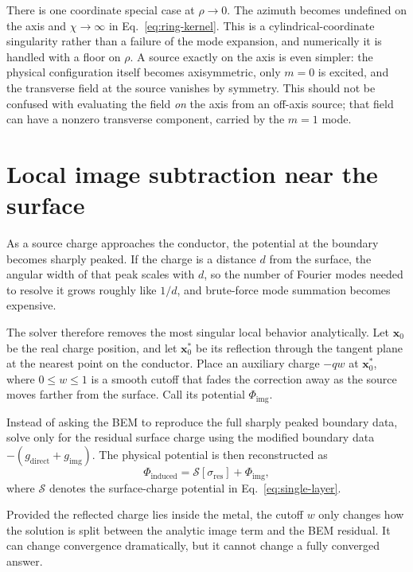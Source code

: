 \documentclass[11pt]{article}
\begin{document}
There is one coordinate special case at $\rho\to0$.  The azimuth becomes
undefined on the axis and $\chi\to\infty$ in Eq.~\eqref{eq:ring-kernel}.  This
is a cylindrical-coordinate singularity rather than a failure of the mode
expansion, and numerically it is handled with a floor on $\rho$.  A source
exactly on the axis is even simpler: the physical configuration itself becomes
axisymmetric, only $m=0$ is excited, and the transverse field at the source
vanishes by symmetry.  This should not be confused with evaluating the field
\emph{on} the axis from an off-axis source; that field can have a nonzero
transverse component, carried by the $m=1$ mode.

\section{Local image subtraction near the surface}

As a source charge approaches the conductor, the potential at the boundary becomes sharply
peaked.  If the charge is a distance $d$ from the surface, the angular width of
that peak scales with $d$, so the number of Fourier modes needed to resolve it
grows roughly like $1/d$, and brute-force mode
summation becomes expensive.

The solver therefore removes the most singular local behavior analytically.
Let $\mathbf{x}_0$ be the real charge position, and let $\mathbf{x}_0^\ast$ be
its reflection through the tangent plane at the nearest point on the conductor.
Place an auxiliary charge $-qw$ at $\mathbf{x}_0^\ast$, where $0\le w\le1$ is
a smooth cutoff that fades the correction away as the source moves farther from
the surface.  Call its potential $\Phi_{\mathrm{img}}$.

Instead of asking the BEM to reproduce the full sharply peaked boundary data,
solve only for the residual surface charge using the modified boundary data
$-(g_{\mathrm{direct}}+g_{\mathrm{img}})$.  The physical potential is then
reconstructed as
\begin{equation}
  \Phi_{\mathrm{induced}}
  = \mathcal{S}[\sigma_{\mathrm{res}}] + \Phi_{\mathrm{img}},
  \label{eq:reconstruct}
\end{equation}
where $\mathcal{S}$ denotes the surface-charge potential in
Eq.~\eqref{eq:single-layer}.

Provided the reflected charge lies inside the metal, the cutoff $w$ only
changes how the solution is split between the analytic image term and the BEM
residual.  It can change convergence dramatically, but it cannot change a
fully converged answer.
\end{document}
